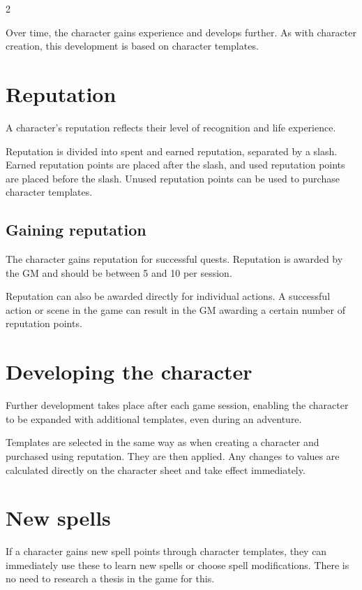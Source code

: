 \label{ch:advancement}

\begin{multicols}{2}

Over time, the character gains experience and develops further. As with character creation, this development is based on character templates.

\section{Reputation}

A character's reputation reflects their level of recognition and life experience.

Reputation is divided into spent and earned reputation, separated by a slash. Earned reputation points are placed after the slash, and used reputation points are placed before the slash. Unused reputation points can be used to purchase character templates.

\subsection{Gaining reputation}

The character gains reputation for successful quests. Reputation is awarded by the GM and should be between 5 and 10 per session.

Reputation can also be awarded directly for individual actions. A successful action or scene in the game can result in the GM awarding a certain number of reputation points.

\section{Developing the character}

Further development takes place after each game session, enabling the character to be expanded with additional templates, even during an adventure.

Templates are selected in the same way as when creating a character and purchased using reputation. They are then applied. Any changes to values are calculated directly on the character sheet and take effect immediately.

\section{New spells}

If a character gains new spell points through character templates, they can immediately use these to learn new spells or choose spell modifications. There is no need to research a thesis in the game for this.
\end{multicols}
